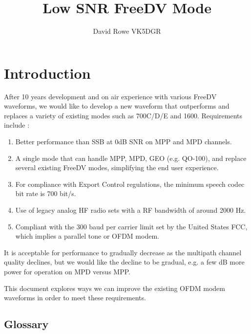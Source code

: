 \documentclass{article}
\begin{document}
\title{Low SNR FreeDV Mode}
\author{David Rowe VK5DGR}
\maketitle


\section{Introduction}

After 10 years development and on air experience with various FreeDV waveforms, we would like to develop a new waveform that outperforms and replaces a variety of existing modes such as 700C/D/E and 1600.  Requirements include \cite{freedv-020}:
\begin{enumerate}
\item Better performance than SSB at 0dB SNR on MPP and MPD channels.
\item A single mode that can handle MPP, MPD, GEO (e.g. QO-100), and replace several existing FreeDV modes, simplifying the end user experience.
\item For compliance with Export Control regulations, the minimum speech codec bit rate is 700 bit/s.
\item Use of legacy analog HF radio sets with a RF bandwidth of around 2000 Hz.
\item Compliant with the 300 baud per carrier limit set by the United States FCC, which implies a parallel tone or OFDM modem. 
\end{enumerate}
It is acceptable for performance to gradually decrease as the multipath channel quality declines, but we would like the decline to be gradual, e.g. a few dB more power for operation on MPD versus MPP.

This document explores ways we can improve the existing OFDM modem waveforms in order to meet these requirements.

\clearpage

\subsection{Glossary}
\end{document}
